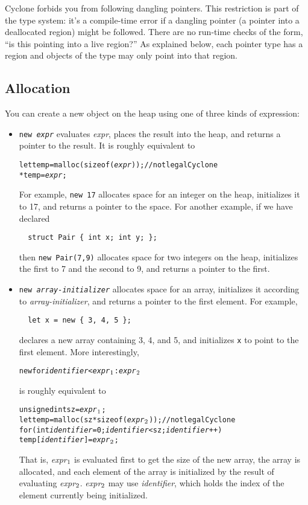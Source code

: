 Cyclone forbids you from following dangling pointers.  This
restriction is part of the type system: it's a compile-time error if a
dangling pointer (a pointer into a deallocated region) might be
followed.  There are no run-time checks of the form, ``is this
pointing into a live region?''  As explained below, each pointer type
has a region and objects of the type may only point into that region.

\subsection{Allocation}
You can create a new object on the heap using one of three kinds of
expression: 
\begin{itemize}
\item \texttt{new {\it expr}} evaluates \textit{expr}, places the
  result into the heap, and returns a pointer to the result.  It is
  roughly equivalent to
\begin{alltt}
  let temp = malloc(sizeof({\it expr})); // not legal Cyclone
  *temp = {\it expr};
\end{alltt}
  For example, \texttt{new 17} allocates space for an integer on the
  heap, initializes it to 17, and returns a pointer to the space.  For
  another example, if we have declared
\begin{verbatim}
  struct Pair { int x; int y; };
\end{verbatim}
  then \texttt{new Pair(7,9)} allocates space for two integers on the
  heap, initializes the first to 7 and the second to 9, and returns a
  pointer to the first.

\item \texttt{new {\it array-initializer}} allocates space for an
  array, initializes it according to \textit{array-initializer}, and
  returns a pointer to the first element.  For example,
\begin{verbatim}
  let x = new { 3, 4, 5 };
\end{verbatim}
  declares a new array containing 3, 4, and 5, and initializes
  \texttt{x} to point to the first element.  More interestingly,
\begin{alltt}
  new \lb for {\it identifier} < {\it expr}\(\sb{1}\) : {\it expr}\(\sb{2}\) \rb
\end{alltt}
  is roughly equivalent to
\begin{alltt}
  unsigned int sz = {\it expr}\(\sb{1}\);
  let temp = malloc(sz * sizeof({\it expr}\(\sb{2}\))); // not legal Cyclone
  for (int {\it identifier} = 0; {\it identifier} < sz; {\it identifier}++)
    temp[{\it identifier}] = {\it expr}\(\sb{2}\);
\end{alltt}
  That is, 
  {\it expr}\(\sb{1}\)
  is evaluated first to get the size of the new array,
  the array is allocated, and each element of the array is
  initialized by the result of evaluating
  {\it expr}\(\sb{2}\).
  {\it expr}\(\sb{2}\) may use {\it identifier}, which 
  holds the index of the element currently being initialized.
  

\end{itemize}
